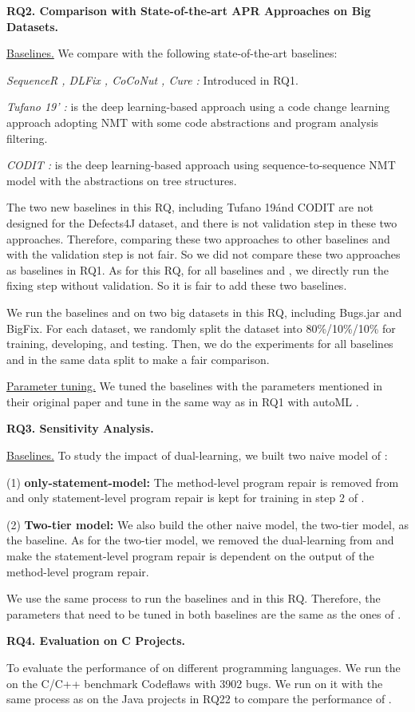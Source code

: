 {\bf RQ2. Comparison with State-of-the-art APR Approaches on Big Datasets.}

\underline{Baselines.} We compare {\tool} with the following state-of-the-art baselines:

{\it SequenceR \cite{chen2018sequencer}, DLFix \cite{li2020dlfix}, CoCoNut \cite{lutellier2020coconut}, Cure \cite{cure-icse21}: } Introduced in RQ1.

{\it Tufano 19’ \cite{tufano2019learning}: } is the deep learning-based approach using a code change learning approach adopting NMT with some code abstractions and program analysis filtering.

{\it CODIT \cite{chakrabortycodit}: } is the deep learning-based approach using sequence-to-sequence NMT model with the abstractions on tree structures.

The two new baselines in this RQ, including Tufano 19\' and CODIT are not designed for the Defects4J dataset, and there is not validation step in these two approaches. Therefore, comparing these two approaches to other baselines and \tool with the validation step is not fair. So we did not compare these two approaches as baselines in RQ1. As for this RQ, for all baselines and \tool, we directly run the fixing step without validation. So it is fair to add these two baselines.

We run the baselines and \tool on two big datasets in this RQ, including Bugs.jar and BigFix. For each dataset, we randomly split the dataset into 80\%/10\%/10\% for training, developing, and testing. Then, we do the experiments for all baselines and \tool in the same data split to make a fair comparison.

\underline{Parameter tuning.} We tuned the baselines with the parameters mentioned in their original paper and tune \tool in the same way as in RQ1 with autoML \cite{NNI}.

{\bf RQ3. Sensitivity Analysis.}

\underline{Baselines.} To study the impact of dual-learning, we built two naive model of {\tool}: 

(1) \textbf{only-statement-model:} The method-level program repair is removed from {\tool} and only statement-level program repair is kept for training in step 2 of \tool.

(2) \textbf{Two-tier model:} We also build the other naive model, the two-tier model, as the baseline. As for the two-tier model, we removed the dual-learning from {\tool} and make the statement-level program repair is dependent on the output of the method-level program repair.

We use the same process to run the baselines and \tool in this RQ. Therefore, the parameters that need to be tuned in both baselines are the same as the ones of \tool. 

{\bf RQ4. Evaluation on C Projects.}

To evaluate the performance of \tool on different programming languages. We run the \tool on the C/C++ benchmark Codeflaws \cite{tan2017codeflaws} with 3902 bugs. We run \tool on it with the same process as on the Java projects in RQ22 to compare the performance of \tool.
